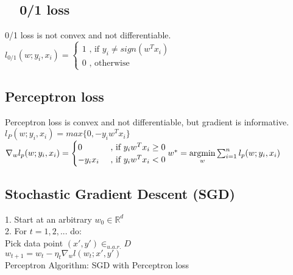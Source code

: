 \subsection*{ ~~0/1 loss}
0/1 loss is not convex and not differentiable.\\
$l_{0/1} (w;y_i,x_i) =
\begin{cases}
    1 \text{ , if } y_i \neq sign(w^Tx_i)\\
		0 \text{ , otherwise} 
\end{cases}$

\subsection*{Perceptron loss}
Perceptron loss is convex and not differentiable, but gradient is informative.\\
$l_{P} (w;y_i,x_i) = max\{0, -y_i w^T x_i \}$\\
$\nabla_w l_p(w;y_i,x_i) = \begin{cases}
    0 &\text{ , if } y_i w^T x_i \geq 0\\
    -y_i x_i &\text{ , if } y_i w^T x_i <0
\end{cases}\\
w^* = \underset{w}{\operatorname{argmin}} \sum_{i=1}^n l_p (w;y_i,x_i)$

\subsection*{Stochastic Gradient Descent (SGD)}
1. Start at an arbitrary $w_0 \in \mathbb{R}^d$\\
2. For $t = 1, 2,  ...$ do: \\
	Pick data point $(x',y') \in_{u.a.r.} D$\\
	$w_{t+1} = w_t - \eta_t \nabla_w l(w_t;x',y')$\\
Perceptron Algorithm: SGD with Perceptron loss



